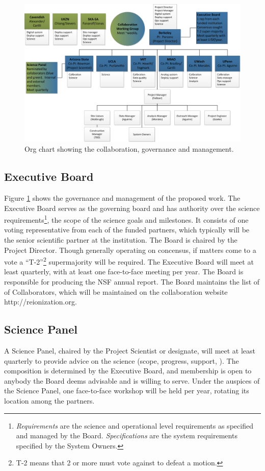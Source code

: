 \documentclass[preprint]{aastex}
\begin{document}
\begin{figure}[h]
\centering
\includegraphics[width=\textwidth]{plots/org.png}
\caption{\small Org chart showing the collaboration, governance and management.}
\label{fig:org}
\end{figure}

\subsection{Executive Board}
Figure \ref{fig:org} shows the governance and management of the proposed work. The
Executive Board serves as the governing board and has authority over the science
requirements\footnote{{\em Requirements} are the science and operational level
requirements as specified and managed by the Board. {\em Specifications} are the
system requirements specified by the System Owners.}, the scope of the science goals
and milestones. It consists of one voting representative from each of the funded
partners, which typically will be the senior scientific partner at the institution.
The Board is chaired by the Project Director. Though generally operating on
concensus, if matters come to a vote a ``T-2''\footnote{T-2 means that 2 or more must
vote against to defeat a motion.} supermajority will be required. The Executive Board
will meet at least quarterly, with at least one face-to-face meeting per year. The
Board is responsible for producing the NSF annual report. The Board maintains the
list of of Collaborators, which will be maintained on the collaboration website
http://reionization.org.

\subsection{Science Panel}
A Science Panel, chaired by the Project Scientist or designate, will meet at least
quarterly to provide advice on the science (scope, progress, support, ). The
composition is determined by the Executive Board, and membership is open to anybody
the Board deems advisable and is willing to serve. Under the auspices of the Science
Panel, one face-to-face workshop will be held per year, rotating its location among
the partners.
\end{document}
